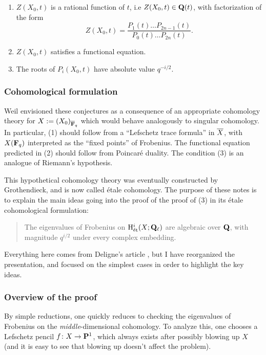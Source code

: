 \begin{conj}[Weil]  \text{} 

\begin{enumerate}
\item $Z(X_0, t)$ is a rational function of $t$, i.e $Z(X_0,t) \in \mathbf{Q}(t)$, with factorization of the form
\[
Z(X_0,t) = \frac{P_1 (t) \ldots P_{2n-1}(t)}{P_0(t) \ldots P_{2n}(t)}.
\]
\item $Z(X_0,t)$ satisfies a functional equation. 
\item The roots of $P_i(X_0,t)$ have absolute value $q^{-i/2}$. 
\end{enumerate}
\end{conj}

\subsubsection{Cohomological formulation}

Weil envisioned these conjectures as a consequence of an appropriate cohomology theory for $X := (X_0)_{\overline{\mathbf{F}}_q}$ which would behave analogously to singular cohomology. In particular, (1) should follow from a ``Lefschetz trace formula'' in $\overline{X}$, with $X(\mathbf{F}_q)$ interpreted as the ``fixed points'' of Frobenius. The functional equation predicted in (2) should follow from Poincar\'{e} duality. The condition (3) is an analogue of Riemann's hypothesis. 

This hypothetical cohomology theory was eventually constructed by Grothendieck, and is now called \'{e}tale cohomology. The purpose of these notes is to explain the main ideas going into the proof of the proof of (3) in its \'{e}tale cohomological formulation:
\begin{quotation}
The eigenvalues of Frobenius on $\mathrm{H}^i_{\operatorname{\acute{e}t}}(X; \mathbf{Q}_{\ell})$ are algebraic over $\mathbf{Q}$, with magnitude $q^{i/2}$ under every complex embedding. 
\end{quotation}
Everything here comes from Deligne's article \cite{weil-i}, but I have reorganized the presentation, and focused on the simplest cases in order to highlight the key ideas. 


\subsubsection{Overview of the proof}
 By simple reductions, one quickly reduces to checking the eigenvalues of Frobenius on the \emph{middle}-dimensional cohomology. To analyze this, one chooses a Lefschetz pencil $f \colon X \rightarrow \mathbf{P}^1$, which always exists after possibly blowing up $X$ (and it is easy to see that blowing up doesn't affect the problem). 

